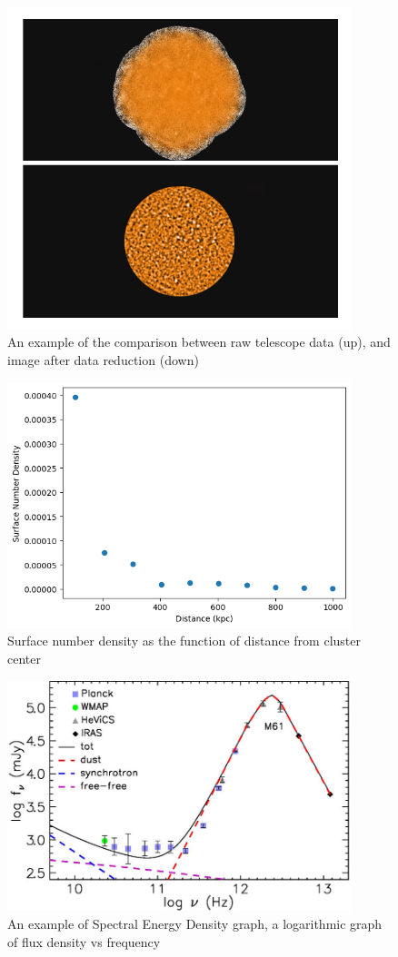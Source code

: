 \documentclass{article}
\begin{document}
\begin{figure}
    \centering
    \includegraphics[width=100mm]{reducevsunreduce.png}
    \caption{An example of the comparison between raw telescope data (up), and image after data reduction (down)}
    \label{fig:reducevsunreduce}
\end{figure}

\begin{figure}
    \centering
    \includegraphics[width=100mm]{SNDensity.png}
    \caption{Surface number density as the function of distance from cluster center}
    \label{fig:sndensity}
\end{figure}

\begin{figure}
    \centering
    \includegraphics[width=100mm]{SED.png}
    \caption{An example of Spectral Energy Density graph, a logarithmic graph of flux density vs frequency}
    \label{fig:sedgraph}
\end{figure}
\end{document}
